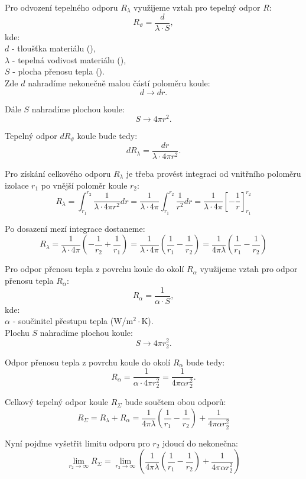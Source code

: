 \documentclass{article}
\begin{document}
Pro odvození tepelného odporu $R_{\lambda}$ využijeme vztah pro tepelný odpor $R$:
$$
    R_{\vartheta} = \frac{d}{\lambda \cdot S},
$$
kde:\\
$d$ - tloušťka materiálu (\ueqM),\\
$\lambda$ - tepelná vodivost materiálu (\ueqWandMinvKinv),\\
$S$ - plocha přenosu tepla (\ueqMsq).\\

Zde $d$ nahradíme nekonečně malou částí poloměru koule:
$$
    d \rightarrow dr.
$$

Dále $S$ nahradíme plochou koule:
$$
    S \rightarrow 4 \pi r^2.
$$

Tepelný odpor $dR_{\vartheta}$ koule bude tedy:
$$
    dR_\lambda = \frac{dr}{\lambda \cdot 4 \pi r^2}.
$$

Pro získání celkového odporu $R_{\lambda}$ je třeba provést integraci od vnitřního poloměru izolace $r_1$ po vnější poloměr koule $r_2$:
$$
    R_\lambda = \int_{r_1}^{r_2} \frac{1}{\lambda \cdot 4 \pi r^2} dr = \frac{1}{\lambda \cdot 4 \pi} \int_{r_1}^{r_2} \frac{1}{r^2} dr = \frac{1}{\lambda \cdot 4 \pi} \left[ -\frac{1}{r} \right]_{r_1}^{r_2}
$$

Po dosazení mezí integrace dostaneme:
$$
    R_\lambda = \frac{1}{\lambda \cdot 4 \pi} \left( -\frac{1}{r_2} + \frac{1}{r_1} \right) = \frac{1}{\lambda \cdot 4 \pi} \left( \frac{1}{r_1} - \frac{1}{r_2} \right) = \frac{1}{4 \pi \lambda} \left( \frac{1}{r_1} - \frac{1}{r_2} \right)
$$

Pro odpor přenosu tepla z povrchu koule do okolí $R_{\alpha}$ využijeme vztah pro odpor přenosu tepla $R_{\alpha}$:
$$
    R_\alpha = \frac{1}{\alpha \cdot S},
$$
kde:\\
$\alpha$ - součinitel přestupu tepla (W/m$^2 \cdot$K).\\

Plochu $S$ nahradíme plochou koule:
$$
    S \rightarrow 4 \pi r_2^2.
$$

Odpor přenosu tepla z povrchu koule do okolí $R_\alpha$ bude tedy:
$$
    R_\alpha = \frac{1}{\alpha \cdot 4 \pi r_2^2} = \frac{1}{4 \pi \alpha r_2^2}.
$$

Celkový tepelný odpor koule $R_\Sigma$ bude součtem obou odporů:
$$
    R_\Sigma = R_{\lambda} + R_\alpha = \frac{1}{4 \pi \lambda} \left( \frac{1}{r_1} - \frac{1}{r_2} \right) + \frac{1}{4 \pi \alpha r_2^2}
$$

Nyní pojďme vyšetřit limitu odporu pro $r_2$ jdoucí do nekonečna:
$$
    \lim_{r_2 \to \infty} R_\Sigma = \lim_{r_2 \to \infty} \left( \frac{1}{4 \pi \lambda} \left( \frac{1}{r_1} - \frac{1}{r_2} \right) + \frac{1}{4 \pi \alpha r_2^2} \right)
$$
\end{document}
